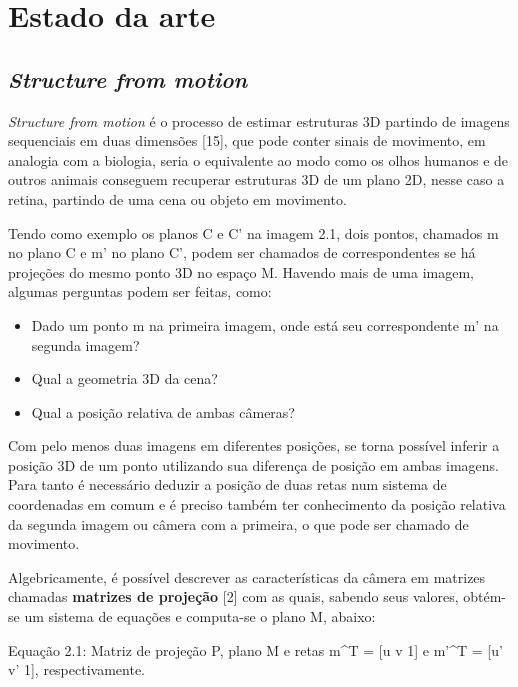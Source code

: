 \chapter{Estado da arte}

\section{\textit{Structure from motion}}

\textit{Structure from motion} é o processo de estimar estruturas 3D partindo de imagens sequenciais em duas dimensões [15], que pode conter sinais de movimento, em analogia com a biologia, seria o equivalente ao modo  como os olhos humanos e de outros animais conseguem recuperar estruturas 3D de um plano 2D, nesse caso a retina, partindo de uma cena ou objeto em movimento.

Tendo como exemplo os planos C e C’ na imagem 2.1, dois pontos, chamados m no plano C e m’ no plano C', podem ser chamados de correspondentes se há projeções do mesmo ponto 3D no espaço M. Havendo mais de uma imagem, algumas perguntas podem ser feitas, como:

\begin{itemize}
	\item{Dado um ponto m na primeira imagem, onde está seu correspondente m’ na segunda imagem?}
	\item{Qual a geometria 3D da cena?}
	\item{Qual a posição relativa de ambas câmeras?}
\end{itemize}
	
Com pelo menos duas imagens em diferentes posições, se torna possível inferir a posição 3D de um ponto utilizando sua diferença de posição em ambas imagens. Para tanto é necessário deduzir a posição de duas retas num sistema de coordenadas em comum e é preciso também ter conhecimento da posição relativa da segunda imagem ou câmera com a primeira, o que pode ser chamado de movimento.

Algebricamente, é possível descrever as características da câmera em matrizes chamadas \textbf{matrizes de projeção} [2] com as quais, sabendo seus valores, obtém-se um sistema de equações e computa-se o plano M, abaixo:


Equação 2.1: Matriz de projeção P, plano M e retas m\textasciicircum T = [u v 1] e m’\textasciicircum T = [u’ v’ 1], respectivamente.


